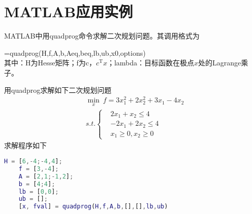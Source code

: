 \section{MATLAB应用实例}
    \par
    MATLAB中用quadprog命令求解二次规划问题。其调用格式为
    \par
    [x,fval,exitflag,output,lambda]=quadprog(H,f,A,b,Aeq,beq,lb,ub,x0,options)\\
    其中：H为Hesse矩阵；f为c，$c^\mathrm{T} x$；lambda：目标函数在极点$x$处的Lagrange乘子。
    \par
    用quadprog求解如下二次规划问题
    \begin{align*}
    &\mathop {\min}\limits_x \ f=3 x_1^2+2x_2^2+3x_1-4x_2\\
    &s.t.\left\{
    \begin{aligned}
    &2x_1+x_2 \leqslant 4\\
    &-2x_1+2x_2 \leqslant 4\\
    &x_1 \geqslant 0,x_2 \geqslant 0
    \end{aligned}
    \right.
    \end{align*}
    求解程序如下
    \begin{lstlisting}[language=Matlab]
    H = [6,-4;-4,4];
    f = [3,-4];
    A = [2,1;-1,2];
    b = [4;4];
    lb = [0,0];
    ub = [];
    [x, fval] = quadprog(H,f,A,b,[],[],lb,ub)
    \end{lstlisting}
